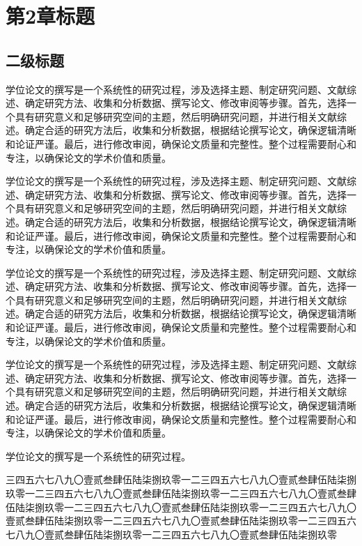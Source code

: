 \documentclass[master,academic]{ysuthesis} %
\begin{document}
	\chapter{第2章标题}

	\section{二级标题}

		学位论文的撰写是一个系统性的研究过程，涉及选择主题、制定研究问题、文献综述、确定研究方法、收集和分析数据、撰写论文、修改审阅等步骤。首先，选择一个具有研究意义和足够研究空间的主题，然后明确研究问题，并进行相关文献综述。确定合适的研究方法后，收集和分析数据，根据结论撰写论文，确保逻辑清晰和论证严谨。最后，进行修改审阅，确保论文质量和完整性。整个过程需要耐心和专注，以确保论文的学术价值和质量。

		学位论文的撰写是一个系统性的研究过程，涉及选择主题、制定研究问题、文献综述、确定研究方法、收集和分析数据、撰写论文、修改审阅等步骤。首先，选择一个具有研究意义和足够研究空间的主题，然后明确研究问题，并进行相关文献综述。确定合适的研究方法后，收集和分析数据，根据结论撰写论文，确保逻辑清晰和论证严谨。最后，进行修改审阅，确保论文质量和完整性。整个过程需要耐心和专注，以确保论文的学术价值和质量。

		学位论文的撰写是一个系统性的研究过程，涉及选择主题、制定研究问题、文献综述、确定研究方法、收集和分析数据、撰写论文、修改审阅等步骤。首先，选择一个具有研究意义和足够研究空间的主题，然后明确研究问题，并进行相关文献综述。确定合适的研究方法后，收集和分析数据，根据结论撰写论文，确保逻辑清晰和论证严谨。最后，进行修改审阅，确保论文质量和完整性。整个过程需要耐心和专注，以确保论文的学术价值和质量。

		学位论文的撰写是一个系统性的研究过程，涉及选择主题、制定研究问题、文献综述、确定研究方法、收集和分析数据、撰写论文、修改审阅等步骤。首先，选择一个具有研究意义和足够研究空间的主题，然后明确研究问题，并进行相关文献综述。确定合适的研究方法后，收集和分析数据，根据结论撰写论文，确保逻辑清晰和论证严谨。最后，进行修改审阅，确保论文质量和完整性。整个过程需要耐心和专注，以确保论文的学术价值和质量。

		学位论文的撰写是一个系统性的研究过程。

		三四五六七八九〇壹贰叁肆伍陆柒捌玖零一二三四五六七八九〇壹贰叁肆伍陆柒捌玖零一二三四五六七八九〇壹贰叁肆伍陆柒捌玖零一二三四五六七八九〇壹贰叁肆伍陆柒捌玖零一二三四五六七八九〇壹贰叁肆伍陆柒捌玖零一二三四五六七八九〇壹贰叁肆伍陆柒捌玖零一二三四五六七八九〇壹贰叁肆伍陆柒捌玖零一二三四五六七八九〇壹贰叁肆伍陆柒捌玖零一二三四五六七八九〇壹贰叁肆伍陆柒捌玖零
\end{document}
